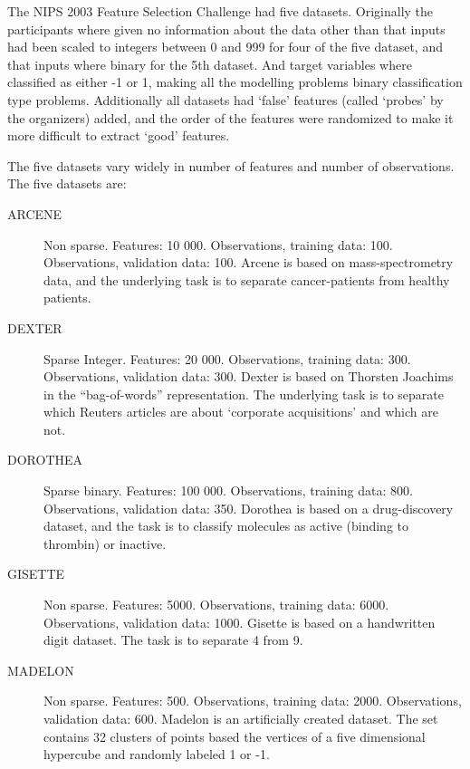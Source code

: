 \documentclass[12pt]{article}
\begin{document}
The NIPS 2003 Feature Selection Challenge had five datasets. Originally the participants where given no information about the data other than that inputs had been scaled to integers between 0 and 999 for four of the five dataset, and that inputs where binary for the 5th dataset. And target variables where classified as either -1 or 1, making all the modelling problems binary classification type problems. Additionally all datasets had `false' features (called `probes' by the organizers) added, and the order of the features were randomized to make it more difficult to extract `good' features.

The five datasets vary widely in number of features and number of observations. The five datasets are:
\begin{description}
\item [ARCENE] Non sparse. Features: 10 000. Observations, training data: 100. Observations, validation data: 100. Arcene is based on mass-spectrometry data, and the underlying task is to separate cancer-patients from healthy patients. 
\item [DEXTER] Sparse Integer. Features: 20 000. Observations, training data: 300. Observations, validation data: 300. Dexter is based on Thorsten Joachims in the “bag-of-words” representation. The underlying task is to separate which Reuters articles are about `corporate acquisitions' and which are not.
\item[DOROTHEA] Sparse binary. Features: 100 000.  Observations, training data: 800.  Observations, validation data: 350. Dorothea is based on a drug-discovery dataset, and the task is to classify molecules as active (binding to thrombin) or inactive.
\item[GISETTE] Non sparse. Features: 5000. Observations, training data: 6000. Observations, validation data: 1000. Gisette is based on a handwritten digit dataset. The task is to separate 4 from 9.
\item[MADELON] Non sparse. Features: 500. Observations, training data: 2000. Observations, validation data: 600. Madelon is an artificially created dataset. The set contains 32 clusters of points based the vertices of a five dimensional hypercube and randomly labeled 1 or -1.
\end{description}
\end{document}
